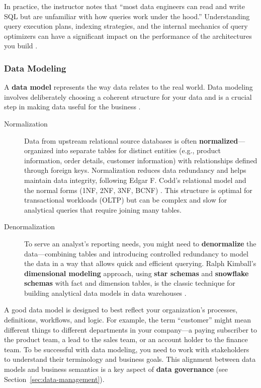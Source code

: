 \documentclass{article}
\begin{document}
In practice, the instructor notes that ``most data engineers can read and write SQL but are unfamiliar with how queries work under the hood.'' Understanding query execution plans, indexing strategies, and the internal mechanics of query optimizers can have a significant impact on the performance of the architectures you build \cite{reis2022fundamentals, date2003introduction}.

\subsubsection{Data Modeling}
A \textbf{data model} represents the way data relates to the real world. Data modeling involves deliberately choosing a coherent structure for your data and is a crucial step in making data useful for the business \cite{kimball2013data}.

\begin{description}
    \item[Normalization] Data from upstream relational source databases is often \textbf{normalized}---organized into separate tables for distinct entities (e.g., product information, order details, customer information) with relationships defined through foreign keys. Normalization reduces data redundancy and helps maintain data integrity, following Edgar F. Codd's relational model and the normal forms (1NF, 2NF, 3NF, BCNF) \cite{codd1970relational, date2003introduction}. This structure is optimal for transactional workloads (OLTP) but can be complex and slow for analytical queries that require joining many tables.

    \item[Denormalization] To serve an analyst's reporting needs, you might need to \textbf{denormalize} the data---combining tables and introducing controlled redundancy to model the data in a way that allows quick and efficient querying. Ralph Kimball's \textbf{dimensional modeling} approach, using \textbf{star schemas} and \textbf{snowflake schemas} with fact and dimension tables, is the classic technique for building analytical data models in data warehouses \cite{kimball2013data}.
\end{description}

A good data model is designed to best reflect your organization's processes, definitions, workflows, and logic. For example, the term ``customer'' might mean different things to different departments in your company---a paying subscriber to the product team, a lead to the sales team, or an account holder to the finance team. To be successful with data modeling, you need to work with stakeholders to understand their terminology and business goals. This alignment between data models and business semantics is a key aspect of \textbf{data governance} (see Section~\ref{sec:data-management}).
\end{document}
